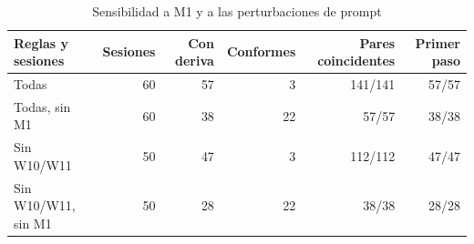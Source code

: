 \begin{table}[!t]
\caption{Sensibilidad a M1 y a las perturbaciones de prompt}
\label{tab:exclusions}
\centering\footnotesize
\setlength{\tabcolsep}{3pt}
\begin{tabular*}{\textwidth}{@{\extracolsep{\fill}}lrrrrr}
\hline
Reglas y sesiones & Sesiones & Con deriva & Conformes & Pares coincidentes & Primer paso\\
\hline
Todas & 60 & 57 & 3 & 141/141 & 57/57\\
Todas, sin M1 & 60 & 38 & 22 & 57/57 & 38/38\\
Sin W10/W11 & 50 & 47 & 3 & 112/112 & 47/47\\
Sin W10/W11, sin M1 & 50 & 28 & 22 & 38/38 & 28/28\\
\hline\end{tabular*}\end{table}
